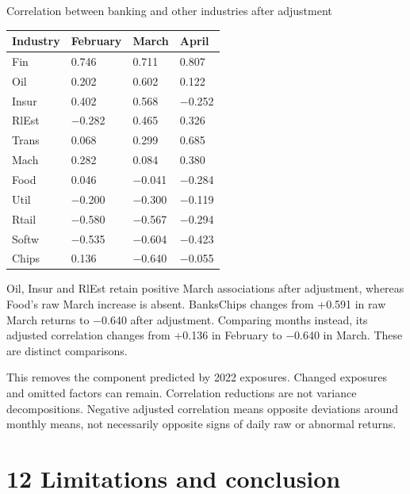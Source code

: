 \documentclass[11pt,a4paper]{article}
\newcommand{\reporttablefont}{\fontsize{9.4}{11.7}\selectfont}
\begin{document}
\begin{minipage}{\linewidth}\captionsetup{type=table}\caption{Correlation between banking and other industries after adjustment}\reporttablefont\renewcommand{\arraystretch}{1.22}\begin{tabular}{@{}L{0.314286\dimexpr{}\tabcolsep\relax}C{0.228571\dimexpr{}\tabcolsep\relax}C{0.228571\dimexpr{}\tabcolsep\relax}C{0.228571\dimexpr{}\tabcolsep\relax}@{}}\toprule
{\sffamily\bfseries\color{navy}Industry} & {\sffamily\bfseries\color{navy}February} & {\sffamily\bfseries\color{navy}March} & {\sffamily\bfseries\color{navy}April}\\\midrule
Fin & 0.746 & 0.711 & 0.807\\
Oil & 0.202 & 0.602 & 0.122\\
Insur & 0.402 & 0.568 & $-$0.252\\
RlEst & $-$0.282 & 0.465 & 0.326\\
Trans & 0.068 & 0.299 & 0.685\\
Mach & 0.282 & 0.084 & 0.380\\
Food & 0.046 & $-$0.041 & $-$0.284\\
Util & $-$0.200 & $-$0.300 & $-$0.119\\
Rtail & $-$0.580 & $-$0.567 & $-$0.294\\
Softw & $-$0.535 & $-$0.604 & $-$0.423\\
Chips & 0.136 & $-$0.640 & $-$0.055\\
\bottomrule\end{tabular}\end{minipage}\par\vspace{5pt}
Oil, Insur and RlEst retain positive March associations after adjustment, whereas Food's raw March increase is absent. Banks\textendash{}Chips changes from +0.591 in raw March returns to $-$0.640 after adjustment. Comparing months instead, its adjusted correlation changes from +0.136 in February to $-$0.640 in March. These are distinct comparisons.

This removes the component predicted by 2022 exposures. Changed exposures and omitted factors can remain. Correlation reductions are not variance decompositions. Negative adjusted correlation means opposite deviations around monthly means, not necessarily opposite signs of daily raw or abnormal returns.

\clearpage
\section*{12 Limitations and conclusion}
\end{document}
